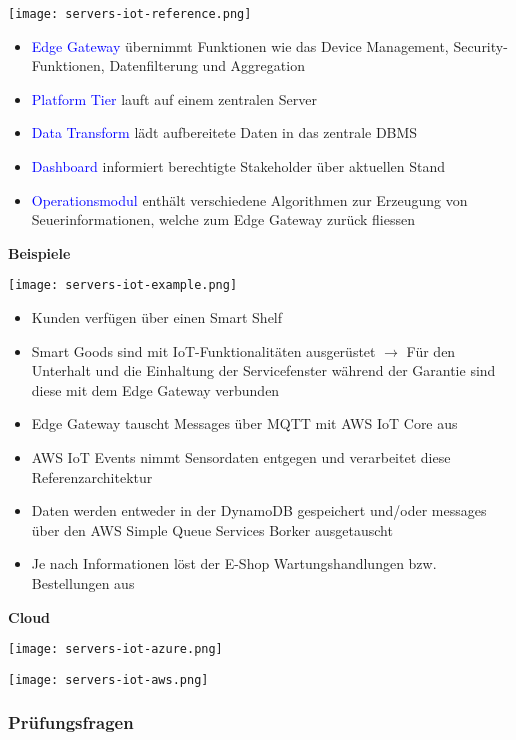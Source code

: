 \texttt{[image: servers-iot-reference.png]}

\begin{itemize}
    \item \textcolor{blue}{Edge Gateway} übernimmt Funktionen wie das Device Management, Security-Funktionen, Datenfilterung und Aggregation
    \item \textcolor{blue}{Platform Tier} lauft auf einem zentralen Server
    \item \textcolor{blue}{Data Transform} lädt aufbereitete Daten in das zentrale DBMS
    \item \textcolor{blue}{Dashboard} informiert berechtigte Stakeholder über aktuellen Stand
    \item \textcolor{blue}{Operationsmodul} enthält verschiedene Algorithmen zur Erzeugung von Seuerinformationen, welche zum Edge Gateway zurück fliessen
\end{itemize}
\vspace{10pt}
\textbf{Beispiele}

\texttt{[image: servers-iot-example.png]}

\begin{itemize}
    \item Kunden verfügen über einen Smart Shelf
    \item Smart Goods sind mit IoT-Funktionalitäten ausgerüstet $\rightarrow$ Für den Unterhalt und die Einhaltung der Servicefenster während der Garantie sind diese mit dem Edge Gateway verbunden
    \item Edge Gateway tauscht Messages über MQTT mit AWS IoT Core aus
    \item AWS IoT Events nimmt Sensordaten entgegen und verarbeitet diese Referenzarchitektur
    \item Daten werden entweder in der DynamoDB gespeichert und/oder messages über den AWS
    Simple Queue Services Borker ausgetauscht
    \item Je nach Informationen löst der E-Shop Wartungshandlungen bzw. Bestellungen aus
\end{itemize}
\vspace{10pt}
\columnbreak
\textbf{Cloud}

\texttt{[image: servers-iot-azure.png]}

\texttt{[image: servers-iot-aws.png]}


\columnbreak
\subsubsection{Prüfungsfragen}

